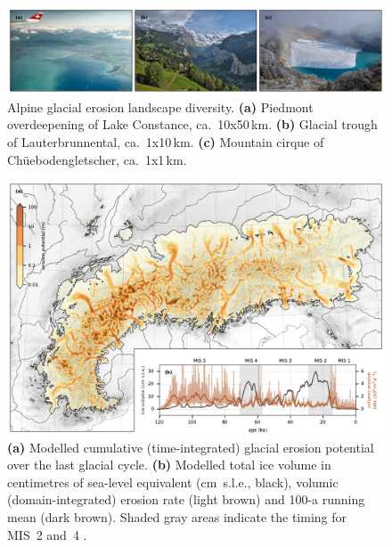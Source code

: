 \documentclass[utf8]{article}
\begin{document}





\clearpage

    \begin{figure}
      \centerline{\includegraphics{alpero_landscape}}
      \caption{%
        Alpine glacial erosion landscape diversity.
        \textbf{(a)} Piedmont overdeepening of Lake Constance, ca.~10x50\,km.
        \textbf{(b)} Glacial trough of Lauterbrunnental, ca.~1x10\,km.
        \textbf{(c)} Mountain cirque of Ch\"uebodengletscher, ca.~1x1\,km.}
      \label{fig:landscape}
    \end{figure}

    \begin{figure}
      \centerline{\includegraphics{alpero_cumulative}}
      \caption{%
        \textbf{(a)} Modelled cumulative (time-integrated) glacial erosion
          potential over the last glacial cycle.
        \textbf{(b)} Modelled total ice volume in centimetres of sea-level
          equivalent (cm~s.l.e., black), volumic (domain-integrated) erosion
          rate (light brown) and 100-a running mean (dark brown). Shaded gray
          areas indicate the timing for MIS~2 and~4
          \citep{Lisiecki.Raymo.2005}.} \label{fig:cumulative}
    \end{figure}
\end{document}
